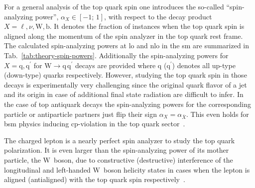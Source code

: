 For a general analysis of the top quark spin one introduces the so-called ``spin-analyzing power'', $\alpha_{X}\in[-1;\,1]$, with respect to the decay product $X=\ell,\nu,\mathrm{W},\mathrm{b}$. It denotes the fraction of instances when the top quark spin is aligned along the momentum of the spin analyzer in the top quark rest frame. The calculated spin-analyzing powers at \gls{lo} and \gls{nlo} in the \gls{sm} are summarized in Tab.~\ref{tab:theory-spin-powers}. Additionally the spin-analyzing powers for $X=\mathrm{q},\mathrm{q}^\prime$ for $\mathrm{W}\to \mathrm{q}\,\mathrm{q}^\prime$ decays are provided where $\mathrm{q}$ ($\mathrm{q}^\prime$) denotes all up-type (down-type) quarks respectively. However, studying the top quark spin in those decays is experimentally very challenging since the original quark flavor of a jet and its origin in case of additional final state radiation are difficult to infer. In the case of top antiquark decays the spin-analyzing powers for the corresponding particle or antiparticle partners just flip their sign $\alpha_{X}=\alpha_{\bar{X}}$. This even holds for \gls{bsm} physics inducing \gls{cp}-violation in the top quark sector~\cite{AguilarSaavedra:2010nx}. 

The charged lepton is a nearly perfect spin analyzer to study the top quark polarization. It is even larger than the spin-analyzing power of its mother particle, the $\mathrm{W}$~boson, due to constructive (destructive) interference of the longitudinal and left-handed $\mathrm{W}$~boson helicity states in cases when the lepton is aligned (antialigned) with the top quark spin respectively~\cite{Bernreuther:2008ju}.


